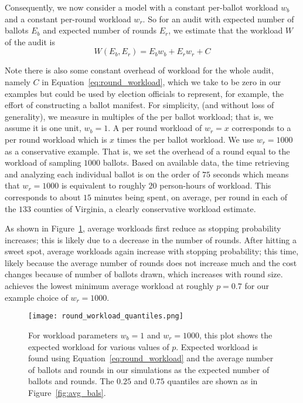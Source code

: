 Consequently, we now consider a model with a constant per-ballot workload $w_b$ and a constant per-round workload $w_r$.
So for an audit with expected number of ballots $E_{b}$ and expected number of rounds $E_{r}$, we estimate that the workload $W$ of the audit is
\begin{equation}
W(E_b,E_r) = E_b w_b + E_r w_r + C
\label{eq:round_workload}
\end{equation}

Note there is also some constant overhead of workload for the whole audit, namely $C$ in Equation~\ref{eq:round_workload}, which we take to be zero in our examples but could be used by election officials to represent, for example, the effort of constructing a ballot manifest.
For simplicity, (and without loss of generality), we measure in multiples of the per ballot workload; that is, we assume it is one unit, $w_b=1$. A per round workload of $w_r=x$ corresponds to a per round workload which is $x$ times the per ballot workload. We use $w_r=1000$ as a conservative example. 
That is, we set the overhead of a round equal to the workload of sampling $1000$ ballots. Based on available data\cite{RI-report}, the time retrieving and analyzing each individual ballot is on the order of $75$ seconds which means that $w_r=1000$ is equivalent to roughly $20$ person-hours of workload. This corresponds to about $15$ minutes being spent, on average, per round in each of the $133$ counties of Virginia, a clearly conservative workload estimate. 

As shown in Figure~\ref{fig:with_round_workload}, average workloads first reduce as stopping probability increases; this is likely due to a decrease in the number of rounds. After hitting a sweet spot, average workloads again increase with stopping probability; this time, likely because the average number of rounds does not increase much and the cost changes because of number of ballots drawn, which increases with round size. \Providence achieves the lowest minimum average workload at roughly $p=0.7$ for our example choice of $w_r=1000$.

\begin{figure}[h!]
\texttt{[image: round\_workload\_quantiles.png]}
\caption{For workload parameters $w_b=1$ and $w_r=1000$, this plot shows the expected workload for various values of $p$. Expected workload is found using Equation~\ref{eq:round_workload} and the average number of ballots and rounds in our simulations as the expected number of ballots and rounds. The $0.25$ and $0.75$ quantiles are shown as in Figure~\ref{fig:avg_bals}.}
\label{fig:with_round_workload}
\end{figure}

